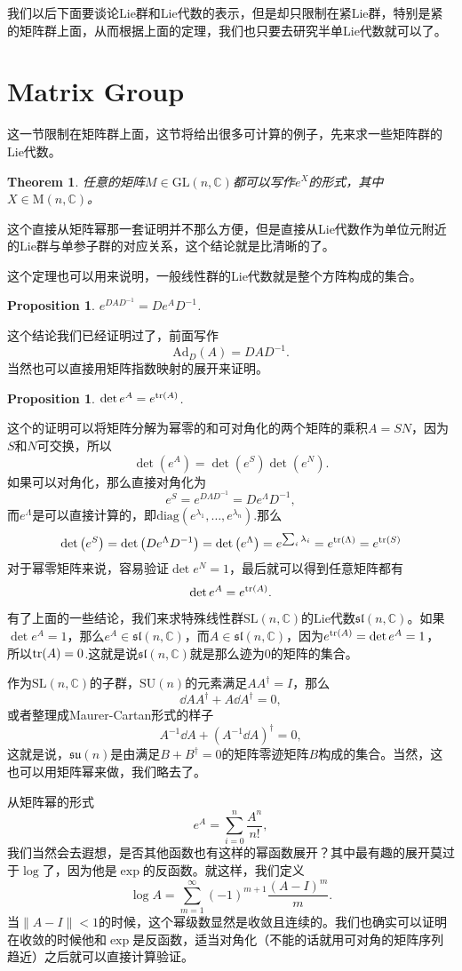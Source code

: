 \documentclass[8pt]{book}
\theoremstyle{plain}
\newtheorem{pro}[defi]{Proposition}
\newtheorem{theo}[defi]{Theorem}
\newcommand{\cc}{\mathbb{C}}
\begin{document}
我们以后下面要谈论Lie群和Lie代数的表示，但是却只限制在紧Lie群，特别是紧的矩阵群上面，从而根据上面的定理，我们也只要去研究半单Lie代数就可以了。

\section{Matrix Group}
这一节限制在矩阵群上面，这节将给出很多可计算的例子，先来求一些矩阵群的Lie代数。
\begin{theo}
任意的矩阵$M\in\mathrm{GL}(n,\cc)$都可以写作$e^X$的形式，其中$X\in\mathrm{M}(n,\cc)$。
\end{theo}
这个直接从矩阵幂那一套证明并不那么方便，但是直接从Lie代数作为单位元附近的Lie群与单参子群的对应关系，这个结论就是比清晰的了。

这个定理也可以用来说明，一般线性群的Lie代数就是整个方阵构成的集合。
\begin{pro}
	$e^{DAD^{-1}}=De^{A}D^{-1}$.
\end{pro}
这个结论我们已经证明过了，前面写作
\[
	\mathrm{Ad}_D(A)=DAD^{-1}.
\]
当然也可以直接用矩阵指数映射的展开来证明。
\begin{pro}
$\det e^A=e^{\operatorname{tr}(A)}$.
\end{pro}
这个的证明可以将矩阵分解为幂零的和可对角化的两个矩阵的乘积$A=SN$，因为$S$和$N$可交换，所以
\[
	\det \left(e^A\right)=\det\left(e^S\right)\det\left(e^N\right).
\]
如果可以对角化，那么直接对角化为
\[
	e^{S}=e^{D\Lambda D^{-1}}=De^{\Lambda} D^{-1},
\]
而$e^{\Lambda}$是可以直接计算的，即$\mathrm{diag}\left(e^{\lambda_1},\dots,e^{\lambda_n}\right)$.那么
\[
	\det \left(e^{S}\right)=\det \left(De^{\Lambda} D^{-1}\right)=\det \left(e^{\Lambda}\right)=e^{\sum_i \lambda_i}=e^{\operatorname{tr}(\Lambda)}=e^{\operatorname{tr}(S)}
\]
对于幂零矩阵来说，容易验证$\det e^N=1$，最后就可以得到任意矩阵都有
\[
	\det e^A=e^{\operatorname{tr}(A)}.
\]

有了上面的一些结论，我们来求特殊线性群$\mathrm{SL}(n,\cc)$的Lie代数$\mathfrak{sl}(n,\cc)$。如果$\det e^A=1$，那么$e^A\in \mathfrak{sl}(n,\cc)$，而$A \in \mathfrak{sl}(n,\cc)$，因为$e^{\operatorname{tr}(A)}=\det e^A=1$，
所以$\operatorname{tr}(A)=0$.这就是说$\mathfrak{sl}(n,\cc)$就是那么迹为0的矩阵的集合。

作为$\mathrm{SL}(n,\cc)$的子群，$\mathrm{SU}(n)$的元素满足$AA^\dag=I$，那么
\[
	\dd A A^\dag+A\dd A^\dag=0,
\]
或者整理成Maurer-Cartan形式的样子
\[
	A^{-1}\dd A +(A^{-1}\dd A)^\dag=0,
\]
这就是说，$\mathfrak{su}(n)$是由满足$B+B^\dag=0$的矩阵零迹矩阵$B$构成的集合。当然，这也可以用矩阵幂来做，我们略去了。

从矩阵幂的形式
\[
	e^A=\sum_{i=0}^n\frac{A^n}{n!},
\]
我们当然会去遐想，是否其他函数也有这样的幂函数展开？其中最有趣的展开莫过于$\log$了，因为他是$\exp$的反函数。就这样，我们定义
\[
	\log A=\sum_{m=1}^\infty (-1)^{m+1}\frac{(A-I)^m}{m}.
\]
当$\|A-I\|<1$的时候，这个幂级数显然是收敛且连续的。我们也确实可以证明在收敛的时候他和$\exp$是反函数，适当对角化（不能的话就用可对角的矩阵序列趋近）之后就可以直接计算验证。
\end{document}
